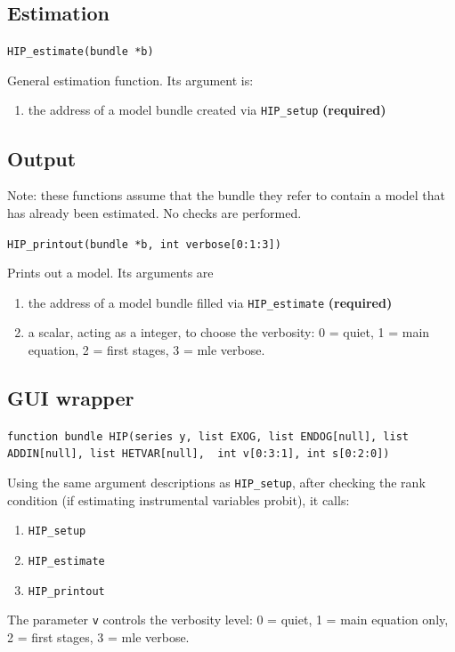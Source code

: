 \documentclass[a4paper,10pt]{article}
\newenvironment{funcdoc}[1]
{\noindent\hrulefill\newline\texttt{#1}\par\noindent\hrulefill\par\medskip\par}
{\bigskip}
\newcommand{\cmd}[1]{\texttt{#1}}
\newcounter{script}[section]
\begin{document}
\subsection{Estimation}
\label{sec:syntax_estim}

\begin{funcdoc}{HIP\_estimate(bundle *b)}
General estimation function. %
Its argument is:
\begin{enumerate}
\item the address of a model bundle created via \texttt{HIP\_setup}
  \textbf{(required)}
\end{enumerate}
\end{funcdoc}

\subsection{Output}
\label{sec:syntax_output}

Note: these functions assume that the bundle they refer to contain a
model that has already been estimated. No checks are performed.

\begin{funcdoc}{HIP\_printout(bundle *b, int verbose[0:1:3])}
  Prints out a model. Its arguments are
  \begin{enumerate}
  \item the address of a model bundle filled via \texttt{HIP\_estimate}
  \textbf{(required)}
  \item a scalar, acting as a integer, to choose the verbosity:
   0 = quiet, 1 = main equation, 2 = first stages, 3 = mle verbose. 
\end{enumerate}
\end{funcdoc}

\subsection{GUI wrapper}
\label{sec:syntax_GUI}

\begin{funcdoc}{function bundle HIP(series y, list EXOG, list ENDOG[null],\ 
		    list ADDIN[null], list HETVAR[null], \
		    int v[0:3:1], int s[0:2:0])}
Using the same argument descriptions as \texttt{HIP\_setup}, after
checking the rank condition (if estimating instrumental variables
probit), it calls:
  \begin{enumerate}
  \item \texttt{HIP\_setup}
  \item \texttt{HIP\_estimate}
  \item \texttt{HIP\_printout}
\end{enumerate}
The parameter \cmd{v} controls the verbosity level: 0 = quiet, 1 =
main equation only, 2 = first stages, 3 = mle verbose.

\end{funcdoc}
\end{document}

